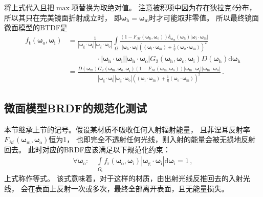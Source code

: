 将上式代入且把$\max$项替换为取绝对值。
注意被积项中因为存在狄拉克$\delta$分布，所以其只在完美镜面折射成立时，
即${\bm\omega}_{\mathrm{h}}={\bm\omega}_{\mathrm{m}}$时才可能取非零值。
所以最终镜面微面模型的BTDF是
\begin{align}\label{eq:08ex01-BTDFMicrofacetFinal}
    f_{\mathrm{t}}({\bm\omega}_{\mathrm{o}},{\bm\omega}_{\mathrm{i}})
     & =\frac{1}{|{\bm\omega}_{\mathrm{g}}\cdot{\bm\omega}_{\mathrm{i}}||{\bm\omega}_{\mathrm{g}}\cdot{\bm\omega}_{\mathrm{o}}|}
    \int\limits_{\varOmega}\frac{(1-F_{\mathcal{M}}({\bm\omega}_{\mathrm{h}},{\bm\omega}_{\mathrm{o}}))
    \delta_{{\bm\omega}_{\mathrm{m}}}({\bm\omega}_{\mathrm{h}})
    |{\bm\omega}_{\mathrm{i}}\cdot{\bm\omega}_{\mathrm{m}}|}
    {|{\bm\omega}_{\mathrm{h}}\cdot{\bm\omega}_{\mathrm{i}}|
    \displaystyle(({\bm\omega}_{\mathrm{i}}\cdot{\bm\omega}_{\mathrm{m}})
    +\frac{1}{\eta}({\bm\omega}_{\mathrm{o}}\cdot{\bm\omega}_{\mathrm{m}}))^2}\nonumber\\
     & \qquad\qquad\cdot|{\bm\omega}_{\mathrm{h}}\cdot{\bm\omega}_{\mathrm{i}}|
     |{\bm\omega}_{\mathrm{h}}\cdot{\bm\omega}_{\mathrm{o}}|
    G_2({\bm\omega}_{\mathrm{h}},{\bm\omega}_{\mathrm{o}},{\bm\omega}_{\mathrm{i}})
    D({\bm\omega}_{\mathrm{h}})\mathrm{d}{\bm\omega}_{\mathrm{h}}\nonumber\\
     & =\frac{D({\bm\omega}_{\mathrm{m}})G_2({\bm\omega}_{\mathrm{m}},{\bm\omega}_{\mathrm{o}},{\bm\omega}_{\mathrm{i}})
        (1-F_{\mathcal{M}}({\bm\omega}_{\mathrm{m}},{\bm\omega}_{\mathrm{o}}))
        |{\bm\omega}_{\mathrm{m}}\cdot{\bm\omega}_{\mathrm{i}}||{\bm\omega}_{\mathrm{m}}\cdot{\bm\omega}_{\mathrm{o}}|}
     {|{\bm\omega}_{\mathrm{g}}\cdot{\bm\omega}_{\mathrm{i}}||{\bm\omega}_{\mathrm{g}}\cdot{\bm\omega}_{\mathrm{o}}|
     \displaystyle(({\bm\omega}_{\mathrm{i}}\cdot{\bm\omega}_{\mathrm{m}})
    +\frac{1}{\eta}({\bm\omega}_{\mathrm{o}}\cdot{\bm\omega}_{\mathrm{m}}))^2}\, .
\end{align}

\subsection{微面模型BRDF的规范化测试}\label{sub:微面模型BRDF的规范化测试}
本节继承上节的记号。假设某材质不吸收任何入射辐射能量，
且菲涅耳反射率$F_{\mathcal{M}}({\bm\omega}_{\mathrm{m}},{\bm\omega}_{\mathrm{o}})$恒为1，
也即完全不透射任何光线，则入射的能量会被无损地反射回去。
此时对应的BRDF应该满足以下规范化约束：
\begin{align}\label{eq:08ex-01-WhiteFurnaceTest}
    \forall {\bm\omega}_{\mathrm{o}}: \quad\int\limits_{{\varOmega}_{\mathrm{i}}}
    f_{\mathrm{r}}({\bm\omega}_{\mathrm{o}},{\bm\omega}_{\mathrm{i}})
    |{\bm\omega}_{\mathrm{g}}\cdot{\bm\omega}_{\mathrm{i}}|\mathrm{d}{\bm\omega}_{\mathrm{i}}=1\, ,
\end{align}
上式称作等式。
该式意味着，对于这样的材质，由出射光线反推回去的入射光线，
会在表面上反射一次或多次，最终全部离开表面，且无能量损失。

